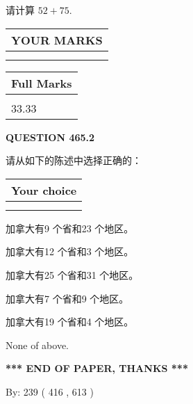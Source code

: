 \documentclass{ctexart}
\begin{document}
  
 
请计算 $ %
52 +  %
75 $.
 

 

 
  
\vspace{0.2in}
  
\noindent\begin{tabular}{|l|}
\hline
 YOUR MARKS  \\
\hline
 \\ 
 \\ 
\hline
\end{tabular}
\hspace{0.05in} \begin{tabular}{|l|}
\hline
 Full Marks  \\
\hline
 \\ 
33.33 \\
\hline
\end{tabular}
{\textbf{\Large{QUESTION
465.2 
}}}
  
  
请从如下的陈述中选择正确的：
  
  
\noindent\hspace{3.0in} \begin{tabular}{|l|}
\hline
Your choice \\
\hline
 \\ 
 \\ 
\hline
\end{tabular}
  
  
 
 
加拿大有9 个省和23 个地区。
 
 
加拿大有12 个省和3 个地区。
 
 
加拿大有25 个省和31 个地区。
 
 
加拿大有7 个省和9 个地区。
 
 
加拿大有19 个省和4 个地区。
 
 
 None of above.
 
 
   
   
 \vspace{0.2in}
 
   
   
   
   
\vspace{1.0in} 
{\textbf{\large{ *** END OF PAPER, THANKS *** }}} 
   
   
\hspace{1.0in} By: 
 239 ( 416 ,  613 )
   
\end{document}
